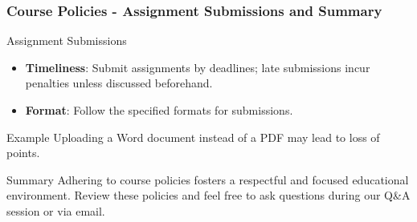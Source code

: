 \documentclass[aspectratio=169]{beamer}
\begin{document}
\begin{frame}[fragile]
    \frametitle{Course Policies - Assignment Submissions and Summary}
    \begin{section*}{Assignment Submissions}
        \begin{itemize}
            \item \textbf{Timeliness}: Submit assignments by deadlines; late submissions incur penalties unless discussed beforehand.
            \item \textbf{Format}: Follow the specified formats for submissions.
        \end{itemize}
        
        \begin{block}{Example}
            Uploading a Word document instead of a PDF may lead to loss of points.
        \end{block}
    \end{section*}
    
    \begin{block}{Summary}
        Adhering to course policies fosters a respectful and focused educational environment. 
        Review these policies and feel free to ask questions during our Q\&A session or via email.
    \end{block}
\end{frame}
\end{document}
